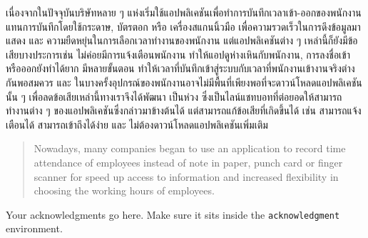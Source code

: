 \maketitle
\makesignature

\ifproject
\begin{abstractTH}

เนื่องจากในปัจจุบันบริษัทหลาย ๆ แห่งเริ่มใช้แอปพลิเคชันเพื่อทำการบันทึกเวลาเข้า-ออกของพนักงาน แทนการบันทึกโดยใช้กระดาษ, บัตรตอก หรือ เครื่องสแกนนิ้วมือ
\enskip เพื่อความรวดเร็วในการดึงข้อมูลมาแสดง และ ความยืดหยุ่นในการเลือกเวลาทำงานของพนักงาน
\enskip แต่แอปพลิเคชันต่าง ๆ เหล่านี้ก็ยังมีข้อเสียบางประการเช่น ไม่ค่อยมีการแจ้งเตือนพนักงาน ทำให้แอปดูห่างเหินกับพนักงาน, 
การลงชื่อเข้าหรือออกยังทำได้ยาก มีหลายขั้นตอน ทำให้เวลาที่บันทึกเข้าสู่ระบบกับเวลาที่พนักงานเข้างานจริงต่างกันพอสมควร 
และ ในบางครั้งอุปกรณ์ของพนักงานอาจไม่มีพื้นที่เพียงพอที่จะดาวน์โหลดแอปพลิเคชันนั้น ๆ
\enskip เพื่อลดข้อเสียเหล่านี้ทางเราจึงได้พัฒนา เป็นห่วง ซึ่งเป็นไลน์แชทบอทที่ต่อยอดให้สามารถทำงานต่าง ๆ ของแอปพลิเคชันซึ่งกล่าวมาข้างต้นได้
แต่สามารถแก้ข้อเสียที่เกิดขึ้นได้ เช่น สามารถแจ้งเตือนได้ สามารถเข้าถึงได้ง่าย และ ไม่ต้องดาวน์โหลดแอปพลิเคชันเพิ่มเติม
\end{abstractTH}


\begin{abstract}
Nowadays, many companies began to use an application to record time attendance of employees instead of note in paper, punch card or finger scanner 
for speed up access to information and increased flexibility in choosing the working hours of employees.
\end{abstract}

\iffalse
\begin{dedication}
This document is dedicated to all Chiang Mai University students.

Dedication page is optional.
\end{dedication}
\fi %

\begin{acknowledgments}
Your acknowledgments go here. Make sure it sits inside the
\texttt{acknowledgment} environment.

\end{acknowledgments}%
\fi %

\contentspage

\ifproject
\figurelistpage

\tablelistpage
\fi %



